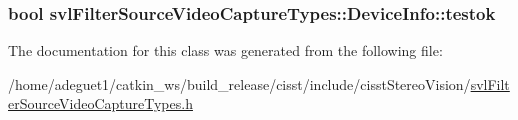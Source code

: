 \hypertarget{classsvl_filter_source_video_capture_types_1_1_device_info_a1ccd6cfa9057071df17b79bac2624c23}{
\subsubsection[{testok}]{\setlength{\rightskip}{0pt plus 5cm}bool svl\-Filter\-Source\-Video\-Capture\-Types\-::\-Device\-Info\-::testok}}\label{classsvl_filter_source_video_capture_types_1_1_device_info_a1ccd6cfa9057071df17b79bac2624c23}


The documentation for this class was generated from the following file\-:\begin{DoxyCompactItemize}
\item 
/home/adeguet1/catkin\-\_\-ws/build\-\_\-release/cisst/include/cisst\-Stereo\-Vision/\hyperlink{svl_filter_source_video_capture_types_8h}{svl\-Filter\-Source\-Video\-Capture\-Types.\-h}\end{DoxyCompactItemize}
